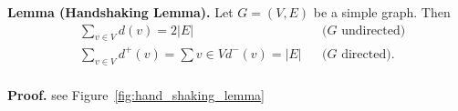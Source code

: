 \textbf{Lemma (Handshaking Lemma).} Let $G=(V,E)$ be a simple graph. Then
\begin{align*}
&\sum_{v\in V} d(v) = 2 |E| &&\text{($G$ undirected)} \\
&\sum_{v\in V} d^{+}(v) = \sum{v\in V} d^{-}(v) = |E| &&\text{($G$ directed).} \\
\end{align*}

\textbf{Proof.} see Figure~\ref{fig:hand_shaking_lemma}

\begin{figure}[htb]
\centering
{}
\end{figure}
